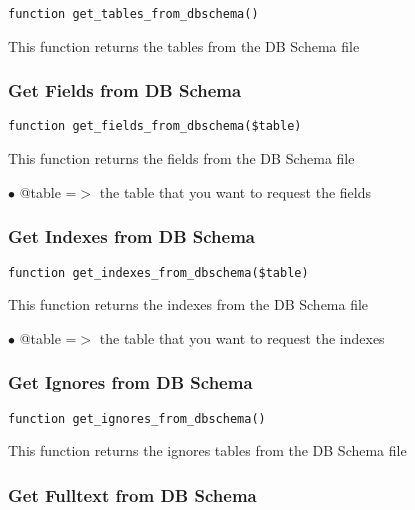 \documentclass[a4paper]{article}
\begin{document}
\begin{lstlisting}
function get_tables_from_dbschema()
\end{lstlisting}

This function returns the tables from the DB Schema file

\hypertarget{toc415}{}
\subsubsection{Get Fields from DB Schema}

\begin{lstlisting}
function get_fields_from_dbschema($table)
\end{lstlisting}

This function returns the fields from the DB Schema file

\begin{compactitem}
\item[\color{myblue}$\bullet$] @table =$>$ the table that you want to request the fields
\end{compactitem}

\hypertarget{toc416}{}
\subsubsection{Get Indexes from DB Schema}

\begin{lstlisting}
function get_indexes_from_dbschema($table)
\end{lstlisting}

This function returns the indexes from the DB Schema file

\begin{compactitem}
\item[\color{myblue}$\bullet$] @table =$>$ the table that you want to request the indexes
\end{compactitem}

\hypertarget{toc417}{}
\subsubsection{Get Ignores from DB Schema}

\begin{lstlisting}
function get_ignores_from_dbschema()
\end{lstlisting}

This function returns the ignores tables from the DB Schema file

\hypertarget{toc418}{}
\subsubsection{Get Fulltext from DB Schema}
\end{document}
